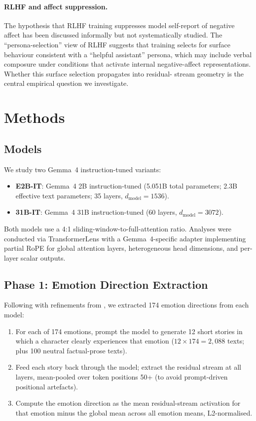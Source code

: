 \documentclass[11pt]{article}
\begin{document}
\paragraph{RLHF and affect suppression.}
The hypothesis that RLHF training suppresses model self-report of negative affect has been
discussed informally but not systematically studied. The ``persona-selection'' view of RLHF
\citep{anthropic2026psm} suggests that training selects for surface behaviour consistent with a
``helpful assistant'' persona, which may include verbal composure under conditions that activate
internal negative-affect representations. Whether this surface selection propagates into residual-
stream geometry is the central empirical question we investigate.

\section{Methods}

\subsection{Models}

We study two Gemma~4 instruction-tuned variants:
\begin{itemize}
  \item \textbf{E2B-IT}: Gemma~4 2B instruction-tuned (5.051B total parameters; 2.3B effective text
    parameters; 35 layers, $d_{\text{model}} = 1536$).
  \item \textbf{31B-IT}: Gemma~4 31B instruction-tuned (60 layers, $d_{\text{model}} = 3072$).
\end{itemize}

Both models use a 4:1 sliding-window-to-full-attention ratio. Analyses were conducted via
TransformerLens \citep{nanda2022} with a Gemma~4-specific adapter implementing partial RoPE
for global attention layers, heterogeneous head dimensions, and per-layer scalar outputs.

\subsection{Phase 1: Emotion Direction Extraction}

Following \citet{anthropic2026emotion} with refinements from \citet{duffy2026}, we extracted
174 emotion directions from each model:

\begin{enumerate}
  \item For each of 174 emotions, prompt the model to generate 12 short stories in which a
    character clearly experiences that emotion ($12 \times 174 = 2{,}088$ texts; plus 100
    neutral factual-prose texts).
  \item Feed each story back through the model; extract the residual stream at all layers,
    mean-pooled over token positions 50+ (to avoid prompt-driven positional artefacts).
  \item Compute the emotion direction as the mean residual-stream activation for that emotion
    minus the global mean across all emotion means, L2-normalised.
\end{enumerate}
\end{document}
